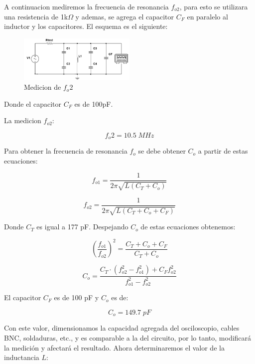 A continuacion mediremos la frecuencia de resonancia $f_{o2}$, para esto se utilizara una resistencia de 1k$\Omega$ y ademas, se agrega el capacitor $C_F$ en paralelo al inductor y los capacitores.
El esquema es el siguiente:

\begin{figure}[H]
    \centering
    \includegraphics[width=0.5\textwidth]{Imagenes/medicion_fo2.png}
    \caption{Medicion de $f_o2$}
\end{figure}

Donde el capacitor $C_F$ es de 100pF.

La medicion $f_{o2}$:

\begin{equation}
    \boxed{f_o2 = 10.5\; MHz}
\end{equation}

Para obtener la frecuencia de resonancia $f_o$ se debe obtener $C_o$ a partir de estas ecuaciones:

\begin{equation}
    f_{o1} = \frac{1}{2\pi\sqrt{L(C_T + C_o)}}
\end{equation}

\begin{equation}
    f_{o2} = \frac{1}{2\pi\sqrt{L(C_T + C_o + C_F)}}
\end{equation}

Donde $C_T$ es igual a 177 pF. Despejando $C_o$ de estas ecuaciones obtenemos:

\begin{equation}
    \left(\frac{f_{o1}}{f_{o2}}\right)^2 = \frac{C_T + C_o + C_F}{C_T + C_o}
\end{equation}

\begin{equation}
    C_o = \frac{C_T \cdot (f_{o2}^2 - f_{o1}^2) + C_F f_{o2}^2}{f_{o1}^2 - f_{o2}^2}
\end{equation}

El capacitor $C_F$ es de 100 pF y $C_o$ es de:

\begin{equation}
    \boxed{C_o = 149.7\; pF}
\end{equation}

Con este valor, dimensionamos la capacidad agregada del osciloscopio, cables BNC, soldaduras, etc., y es comparable a la del 
circuito, por lo tanto, modificará la medición y afectará el resultado. Ahora determinaremos el valor de la inductancia $L$:


